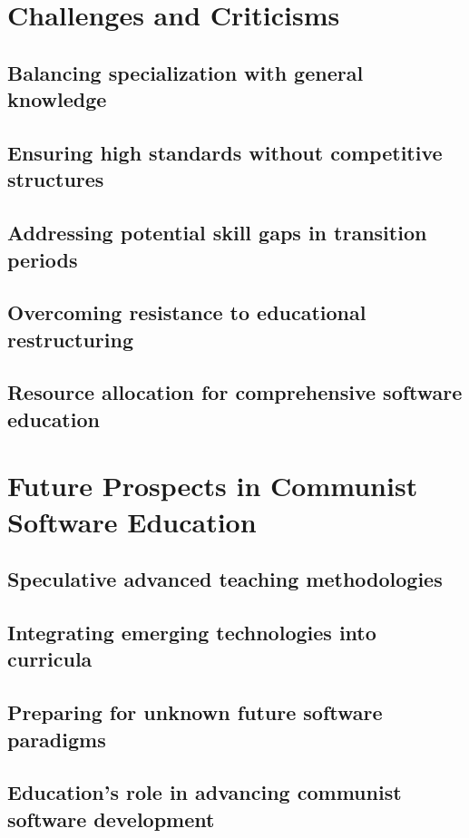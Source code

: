 \newpage

\section{Challenges and Criticisms}
\subsection{Balancing specialization with general knowledge}
\subsection{Ensuring high standards without competitive structures}
\subsection{Addressing potential skill gaps in transition periods}
\subsection{Overcoming resistance to educational restructuring}
\subsection{Resource allocation for comprehensive software education}

\newpage

\section{Future Prospects in Communist Software Education}
\subsection{Speculative advanced teaching methodologies}
\subsection{Integrating emerging technologies into curricula}
\subsection{Preparing for unknown future software paradigms}
\subsection{Education's role in advancing communist software development}

